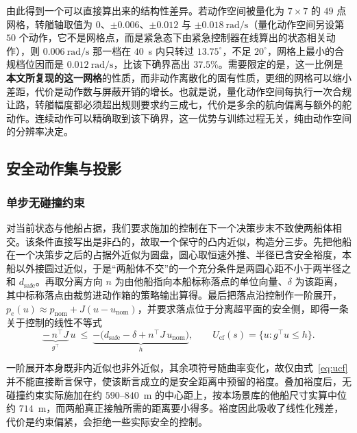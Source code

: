 \documentclass[12pt,letterpaper]{article}
\begin{document}
由此得到一个可以直接算出来的结构性差异。若动作空间被量化为 $7\times7$ 的 $49$ 点网格，转艏轴取值为 $0$、$\pm0.006$、$\pm0.012$ 与 $\pm0.018~\mathrm{rad/s}$（量化动作空间另设第 $50$ 个动作，它不是网格点，而是紧急态下由紧急控制器在线算出的状态相关动作），则 $0.006~\mathrm{rad/s}$ 那一档在 $40$~s 内只转过 $13.75^\circ$，不足 $20^\circ$，网格上最小的合规档位因而是 $0.012~\mathrm{rad/s}$，比该下确界高出 $37.5\%$。需要限定的是，这一比例是\textbf{本文所复现的这一网格}的性质，而非动作离散化的固有性质，更细的网格可以缩小差距，代价是动作数与屏蔽开销的增长。也就是说，量化动作空间每执行一次合规让路，转艏幅度都必须超出规则要求约三成七，代价是多余的航向偏离与额外的舵动作。连续动作可以精确取到该下确界，这一优势与训练过程无关，纯由动作空间的分辨率决定。


\subsection{安全动作集与投影}
\label{sec:proj}

\subsubsection{单步无碰撞约束}

对当前状态与他船占据，我们要求施加的控制在下一个决策步末不致使两船体相交。该条件直接写出是非凸的，故取一个保守的凸内近似，构造分三步。先把他船在一个决策步之后的占据外近似为圆盘，圆心取恒速外推、半径已含安全裕度，本船以外接圆过近似，于是“两船体不交”的一个充分条件是两圆心距不小于两半径之和 $d_{\mathrm{safe}}$。再取分离方向 $n$ 为由他船指向本船标称落点的单位向量、$\delta$ 为该距离，其中标称落点由裁剪进动作箱的策略输出算得。最后把落点沿控制作一阶展开，$p_e(u)\approx p_{\mathrm{nom}}+J(u-u_{\mathrm{nom}})$，并要求落点位于分离超平面的安全侧，即得一条关于控制的线性不等式
\begin{equation}
 \underbrace{-\,n^{\!\top}\!J}_{\textstyle g^{\!\top}}\,u\ \le\ \underbrace{-\bigl(d_{\mathrm{safe}}-\delta+n^{\!\top}\!J\,u_{\mathrm{nom}}\bigr)}_{\textstyle h},
 \qquad U_{\mathrm{cf}}(s)=\{u: g^{\!\top}u\le h\}.
 \label{eq:ucf}
\end{equation}

一阶展开本身既非内近似也非外近似，其余项符号随曲率变化，故仅由式~\eqref{eq:ucf} 并不能直接断言保守，使该断言成立的是安全距离中预留的裕度。叠加裕度后，无碰撞约束实际施加在约 $590$--$840$~m 的中心距上，按本场景库的他船尺寸实算中位约 $714$~m，而两船真正接触所需的距离要小得多。裕度因此吸收了线性化残差，代价是约束偏紧，会拒绝一些实际安全的控制。
\end{document}
